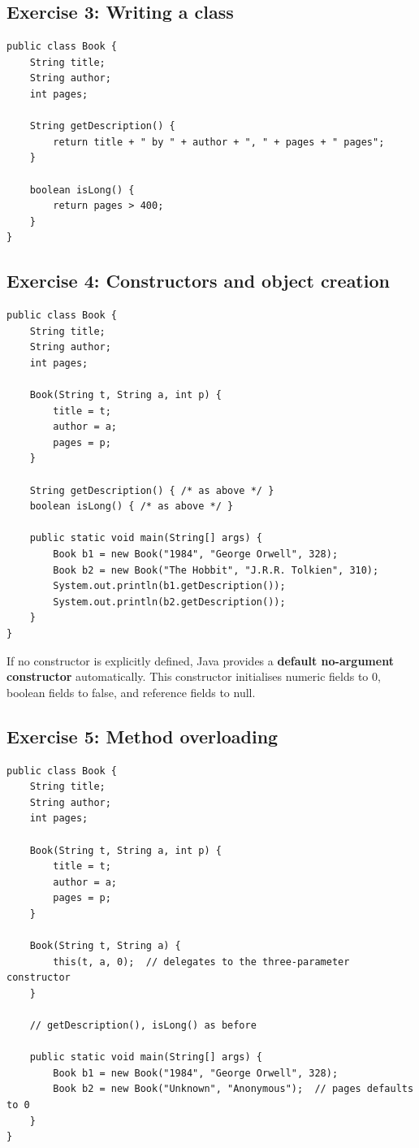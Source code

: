 \documentclass[twoside=false,DIV=14]{scrartcl}
\begin{document}
\subsection*{Exercise 3: Writing a class}

\begin{lstlisting}
public class Book {
    String title;
    String author;
    int pages;

    String getDescription() {
        return title + " by " + author + ", " + pages + " pages";
    }

    boolean isLong() {
        return pages > 400;
    }
}
\end{lstlisting}

\subsection*{Exercise 4: Constructors and object creation}

\begin{lstlisting}
public class Book {
    String title;
    String author;
    int pages;

    Book(String t, String a, int p) {
        title = t;
        author = a;
        pages = p;
    }

    String getDescription() { /* as above */ }
    boolean isLong() { /* as above */ }

    public static void main(String[] args) {
        Book b1 = new Book("1984", "George Orwell", 328);
        Book b2 = new Book("The Hobbit", "J.R.R. Tolkien", 310);
        System.out.println(b1.getDescription());
        System.out.println(b2.getDescription());
    }
}
\end{lstlisting}

If no constructor is explicitly defined, Java provides a \textbf{default no-argument constructor} automatically.  This constructor initialises numeric fields to 0, boolean fields to false, and reference fields to null.

\subsection*{Exercise 5: Method overloading}

\begin{lstlisting}
public class Book {
    String title;
    String author;
    int pages;

    Book(String t, String a, int p) {
        title = t;
        author = a;
        pages = p;
    }

    Book(String t, String a) {
        this(t, a, 0);  // delegates to the three-parameter constructor
    }

    // getDescription(), isLong() as before

    public static void main(String[] args) {
        Book b1 = new Book("1984", "George Orwell", 328);
        Book b2 = new Book("Unknown", "Anonymous");  // pages defaults to 0
    }
}
\end{lstlisting}
\end{document}
